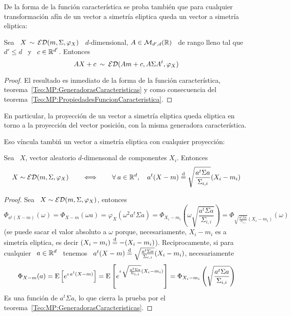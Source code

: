 De  la  forma de  la  funci\'on caracter\'istica  se  proba  tambi\'en que  para
cualquier transformaci\'on  af\'in de un  vector a simetr\'ia eliptica  queda un
vector a simetr\'ia eliptica:
%
\begin{teorema}\label{Teo:MP:TranformacionAfinEliptica}
  Sea  \  $X \,  \sim  \,  \mathcal{ED}(m,\Sigma,\varphi_X)$  \ $d$-dimensional,  $A  \in
  \mathcal{M}_{d',d}(\mathbb{R})$  \ de  rango  lleno tal  que  \ $d'  \le  d$ \  y  \ $c  \in
  \mathbb{R}^{d'}$. Entonces
  \[
  A X + c \: \sim \: \mathcal{ED}(A m + c , A \Sigma A^t , \varphi_X)
  \]
\end{teorema}
%
\begin{proof}
  El  resultado es  inmediato  de  la forma  de  la funci\'on  caracter\'istica,
  teorema~\ref{Teo:MP:GeneradorasCaracteristicas}   y   como  consecuencia   del
  teorema~\ref{Teo:MP:PropiedadesFuncionCaracteristica}.
\end{proof}
%
En particular, la proyecci\'on de  un vector a simetr\'ia eliptica queda eliptica
en  torno a  la proyecci\'on  del vector  posici\'on, con  la  misma generadora
caracter\'istica.
%
%
%

Eso  v\'incula   tambi\'n  un  vector  a  simetr\'ia   eliptica  con  cualquier
proyecci\'on:
%
\begin{teorema}\label{Teo:MP:ProyeccionComponentesEliptica}
  Sea \ $X$, vector aleatorio $d$-dimensonal de componentes $X_i$. Entonces
  \[
  X \sim \mathcal{ED}(m,\Sigma,\varphi_X) \qquad  \Longleftrightarrow \qquad \forall \: a
  \in \mathbb{R}^d, \quad a^t (X - m) \stackrel{\mathrm{d}}{=} \sqrt{\frac{a^t \Sigma a}{\Sigma_{i,i}}}
  (X_i - m_i)
  \]
\end{teorema}
%
\begin{proof}
  Sea \ $X \sim \mathcal{ED}(m,\Sigma,\varphi_X)$, entonces
  \[
  \Phi_{a^t (X - m)}(\omega) = \Phi_{X - m}(\omega a) = \varphi_X\left( \omega^2
    a^t \Sigma  a \right)  = \Phi_{X_i-m_i}\left( \omega  \sqrt{\frac{a^t \Sigma
        a}{\Sigma_{i,i}}}\right)  = \Phi_{\sqrt{\frac{a^t \Sigma
        a}{\Sigma_{i,i}}} (X_i-m_i)}\left( \omega  \right)
  \]
  (se puede sacar el valor absoluto a $\omega$ porque, necesariamente, $X_i-m_i$
  es     a     simetr\'ia    eliptica,     es     decir    $(X_i-m_i)     \stackrel{\mathrm{d}}{=}
  -(X_i-m_i)$). Reciprocamente, si para cualquier  \ $a \in \mathbb{R}^d$ \ tenemos \
  $a^t (X  - m)  \stackrel{\mathrm{d}}{=} \sqrt{\frac{a^t \Sigma  a}{\Sigma_{i,i}}} (X_i  - m_i)$,
  necesariamente
  \[
  \Phi_{X  - m}(a) =  \operatorname{E}\left[ e^{\imath  \, a^t  (X-m)} \right]  = \operatorname{E}\left[
    e^{\imath \, \sqrt{\frac{a^t \Sigma a}{\Sigma_{i,i}}} (X_i - m_i)} \right] =
  \Phi_{X_i-m_i}\left( \sqrt{\frac{a^t \Sigma a}{\Sigma_{i,i}}}\right)
  \]
  Es  una  funci\'on  de  $a^t  \Sigma  a$,  lo que  cierra  la  prueba  por  el
  teorema~\ref{Teo:MP:GeneradorasCaracteristicas}.
\end{proof}

